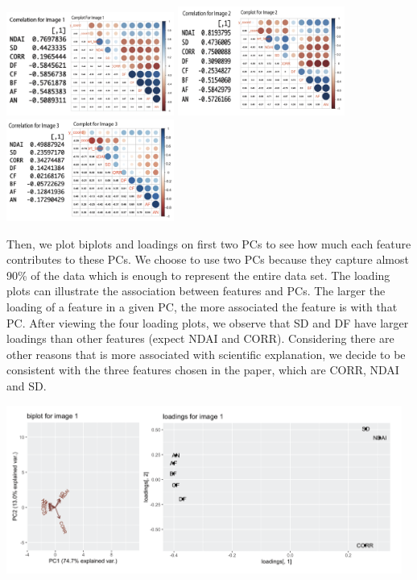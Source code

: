 \documentclass[11pt]{article}
\begin{document}
\includegraphics[width = 5.5cm]{2(c)image1.png}
\includegraphics[width = 5.5cm]{2(c)image2.png}
\includegraphics[width = 5.5cm]{2(c)image3.png}

Then, we plot biplots and loadings on first two PCs to see how much each feature contributes to these PCs. We choose to use two PCs because they capture almost 90\% of the data which is enough to represent the entire data set. The loading plots can illustrate the association between features and PCs. The larger the loading of a feature in a given PC, the more associated the feature is with that PC. After viewing the four loading plots, we observe that SD and DF have larger loadings than other features (expect NDAI and CORR). Considering there are other reasons that is more associated with scientific explanation, we decide to be consistent with the three features chosen in the paper, which are CORR, NDAI and SD.


\includegraphics[width = 13cm]{2(c)pca1.png}
\end{document}
